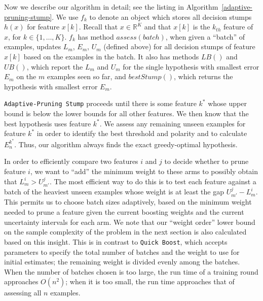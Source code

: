 Now we describe our algorithm in detail; see the
listing in Algorithm~\ref{adaptive-pruning-stump}.
We use $f_k$ to denote an object which stores all decision stumps $h(x)$ for feature
$x[k]$.
Recall that $x \in \mathbb{R}^K$ and that $x[k]$ is the $k_{th}$ feature of $x$,
for $k \in \{ 1, \dots, K \}$.
$f_k$ has method $assess(batch)$, when given a ``batch'' of examples, updates
$L_m$, $E_m$,  $U_m$ (defined above) for all decision stumps of feature $x[k]$ based
on the examples in the batch.
It also has methods $LB()$ and $UB()$, which report the $L_m$ and $U_m$ for the
single hypothesis with smallest error $E_m$ on the $m$ examples seen so far,
and $bestStump()$, which returns the hypothesis with smallest error $E_m$.

\texttt{Adaptive-Pruning Stump} proceeds until there is some feature $k^*$ whose upper bound
is below the lower bounds for all other features.
We then know that the best hypothesis uses feature $k^*$.
We assess any remaining unseen examples
for feature $k^*$ in order to identify the best threshold and polarity
and to calculate $E^{k^*}_n$.
Thus, our algorithm always finds the exact greedy-optimal hypothesis.

In order to efficiently compare two features $i$ and $j$ to decide whether
to prune feature $i$,
we want to ``add'' the minimum weight to these arms to
possibly obtain that $L_m^i > U_{m'}^j$.
The most efficient way to do this is to test each feature against
a batch of the heaviest unseen examples whose weight is at least
the gap $U_{m'}^j - L_m^i$.
This permits us to choose batch sizes adaptively, based on the minimum weight
needed to prune a feature given the current boosting weights and the
current uncertainty intervals for each arm.
We note that our ``weight order'' lower bound on the sample complexity of the
problem in the next section is also calculated based on this insight.
This is in contrast to \texttt{Quick Boost}, which accepts parameters to
specify the total number of batches and the weight to use for initial estimates;
the remaining weight is divided evenly among the batches.
When the number of batches chosen is too large, the run time of a training
round approaches $O(n^2)$; when it is too small, the run time approaches
that of assessing all $n$ examples.

